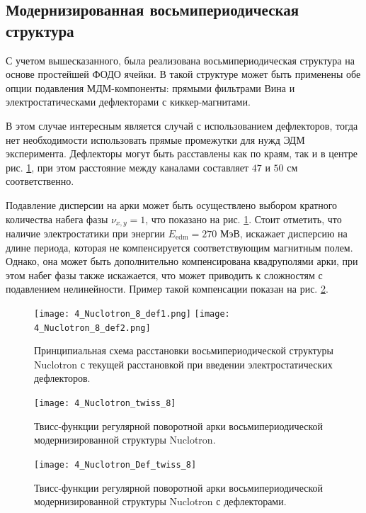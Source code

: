 	\subsection{Модернизированная восьмипериодическая структура}\label{sec:EDM/optics/8period}

\par С учетом вышесказанного, была реализована восьмипериодическая структура на основе простейшей ФОДО ячейки. В такой структуре может быть применены обе опции подавления МДМ-компоненты: прямыми фильтрами Вина и электростатическами дефлекторами с киккер-магнитами.

\par В этом случае интересным является случай с использованием дефлекторов, тогда нет необходимости использовать прямые промежутки для нужд ЭДМ эксперимента. Дефлекторы могут быть расставлены как по краям, так и в центре рис. \ref{fig:4_Nuclotron_8}, при этом расстояние между каналами составляет $47$ и $50$ см соответственно.

\par Подавление дисперсии на арки может быть осуществлено выбором кратного количества набега фазы $\nu_{x,y} = 1$, что показано на рис. \ref{fig:4_Nuclotron_8}. Стоит отметить, что наличие электростатики при энергии $E_{\textrm{edm}}=270$ МэВ, искажает дисперсию на длине периода, которая не компенсируется соответствующим магнитным полем. Однако, она может быть дополнительно компенсирована квадруполями арки, при этом набег фазы также искажается, что может приводить к сложностям с подавлением нелинейности. Пример такой компенсации показан на рис. \ref{fig:4_Nuclotron_twiss_8}.

\begin{figure}[!h]
  \centering
   \texttt{[image: 4\_Nuclotron\_8\_def1.png]}
   \texttt{[image: 4\_Nuclotron\_8\_def2.png]}
   \caption{Принципиальная схема расстановки восьмипериодической структуры Nuclotron с текущей расстановкой при введении электростатических дефлекторов.}
   \label{fig:4_Nuclotron_8}
\end{figure}

\begin{figure}[!h]
  \centering
   \texttt{[image: 4\_Nuclotron\_twiss\_8]}
   \caption{Твисс-функции регулярной поворотной арки восьмипериодической модернизированной структуры Nuclotron.}
   \label{fig:4_Nuclotron_twiss_8}
\end{figure}

\begin{figure}[!h]
  \centering
   \texttt{[image: 4\_Nuclotron\_Def\_twiss\_8]}
   \caption{Твисс-функции регулярной поворотной арки восьмипериодической модернизированной структуры Nuclotron с дефлекторами.}
   \label{fig:4_Nuclotron_Def_twiss_8}
\end{figure}

